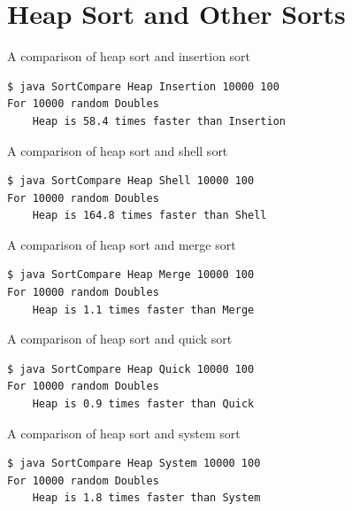 \documentclass[8pt,a4paper,compress]{beamer}
\begin{document}
\section{Heap Sort and Other Sorts}
\begin{frame}[fragile]
\pause

A comparison of heap sort and insertion sort
\begin{lstlisting}[language={}]
$ java SortCompare Heap Insertion 10000 100
For 10000 random Doubles
    Heap is 58.4 times faster than Insertion
\end{lstlisting}

\pause
\bigskip

A comparison of heap sort and shell sort
\begin{lstlisting}[language={}]
$ java SortCompare Heap Shell 10000 100
For 10000 random Doubles
    Heap is 164.8 times faster than Shell
\end{lstlisting}

\pause
\bigskip

A comparison of heap sort and merge sort
\begin{lstlisting}[language={}]
$ java SortCompare Heap Merge 10000 100
For 10000 random Doubles
    Heap is 1.1 times faster than Merge
\end{lstlisting}

\pause
\bigskip

A comparison of heap sort and quick sort
\begin{lstlisting}[language={}]
$ java SortCompare Heap Quick 10000 100
For 10000 random Doubles
    Heap is 0.9 times faster than Quick
\end{lstlisting}

\pause
\bigskip

A comparison of heap sort and system sort
\begin{lstlisting}[language={}]
$ java SortCompare Heap System 10000 100
For 10000 random Doubles
    Heap is 1.8 times faster than System
\end{lstlisting}
\end{frame}
\end{document}
